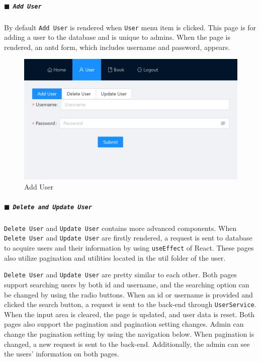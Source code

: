 \subparagraph{$\blacksquare$ \texttt{Add User}}

By default \texttt{Add User} is rendered when \texttt{User} menu item is clicked. This page is for adding a user to the database and is unique to admins. When the page is rendered, an antd form, which includes username and password, appears.

\begin{figure}[H]
  \centering
  \includegraphics[width=.7\textwidth]{img/front-end/user-add.png}
  \caption{Add User}
\end{figure}

\subparagraph{$\blacksquare$ \texttt{Delete and Update User}}

\texttt{Delete User} and \texttt{Update User} contains more advanced components. When \texttt{Delete User} and \texttt{Update User} are firstly rendered, a request is sent to database to acquire users and their information by using \texttt{useEffect} of React. These pages also utilize pagination and utilities located in the util folder of the user.

\texttt{Delete User} and \texttt{Update User} are pretty similar to each other. Both pages support searching users by both id and username, and the searching option can be changed by using the radio buttons. When an id or username is provided and clicked the search button, a request is sent to the back-end through \texttt{UserService}. When the input area is cleared, the page is updated, and user data is reset. Both pages also support the pagination and pagination setting changes. Admin can change the pagination setting by using the navigation below. When pagination is changed, a new request is sent to the back-end. Additionally, the admin can see the users' information on both pages.

